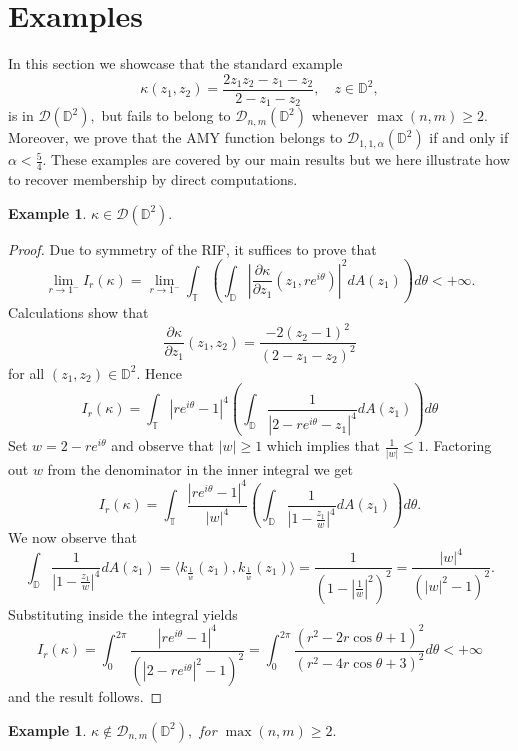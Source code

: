 \documentclass[11pt]{amsart}
\newtheorem{example}[theorem]{Example}
\numberwithin{equation}{section}
\begin{document}
\section{Examples} \label{section 6}
In this section we showcase that the standard example 
\[\kappa(z_1,z_2)=\frac{2z_1z_2-z_1-z_2}{2-z_1-z_2}, \quad z\in \mathbb{D}^2,\]
is in $\mathcal{D}(\mathbb{D}^2),$ but fails to belong to  $\mathcal{D}_{n,m}(\mathbb{D}^2)$ whenever $\max(n,m)\ge 2.$ Moreover, we prove that the AMY function belongs to $\mathcal{D}_{1,1,\alpha}(\mathbb{D}^2)$ if and only if $\alpha<\frac{5}{4}.$
These examples are covered by our main results but we here illustrate how to recover membership by direct computations.
\begin{example} $\kappa \in \mathcal{D}(\mathbb{D}^2).$ 
\end{example}
\begin{proof} Due to symmetry of the RIF, it suffices to prove that
$$\lim_{r\to1^{-}}I_r(\kappa)=\lim_{r\to 1^{-}}\int_{\mathbb{T}}\left(\int_{\mathbb{D}}\left|\frac{\partial \kappa}{\partial z_1}(z_1,re^{i\theta})\right|^2dA(z_1)\right)d\theta<+\infty.$$
Calculations show that 
$$\frac{\partial \kappa}{\partial z_1}(z_1,z_2)=\frac{-2(z_2-1)^2}{(2-z_1-z_2)^2}$$
for all $(z_1,z_2)\in\mathbb{D}^2.$
Hence 
$$I_r(\kappa)=\int_{\mathbb{T}}|re^{i\theta}-1|^4\left(\int_{\mathbb{D}}\frac{1}{|2-re^{i\theta}-z_1|^4}dA(z_1)\right)d\theta$$
Set $w=2-re^{i\theta}$ and observe that $|w|\ge 1$ which implies that $\frac{1}{|w|}\leq 1.$ Factoring out $w$ from the denominator in the inner integral we get
$$I_r(\kappa)=\int_{\mathbb{T}}\frac{|re^{i\theta}-1|^4}{|w|^4}\left(\int_{\mathbb{D}}\frac{1}{\left|1-\frac{z_1}{w}\right|^4}dA(z_1)\right)d\theta.$$
We now observe that
$$\int_{\mathbb{D}}\frac{1}{\left|1-\frac{z_1}{w}\right|^4}dA(z_1)=\langle k_{\frac{1}{\overline{w}}}(z_1),k_{\frac{1}{\overline{w}}}(z_1)\rangle=\frac{1}{\left(1-\left|\frac{1}{w}\right|^2\right)^2}=\frac{|w|^4}{(|w|^2-1)^2}.$$
Substituting inside the integral yields
$$I_r(\kappa)=\int_{0}^{2\pi}\frac{|re^{i\theta}-1|^4}{(|2-re^{i\theta}|^2-1)^2}=\int_{0}^{2\pi}\frac{(r^2-2r\cos \theta+1)^2}{(r^2-4r\cos \theta+3)^2}d\theta<+\infty$$
and the result follows. 
\end{proof}
\begin{example} $\kappa \notin \mathcal{D}_{n,m}(\mathbb{D}^2),$ for $\max(n,m)\ge 2.$
\end{example}
\end{document}
